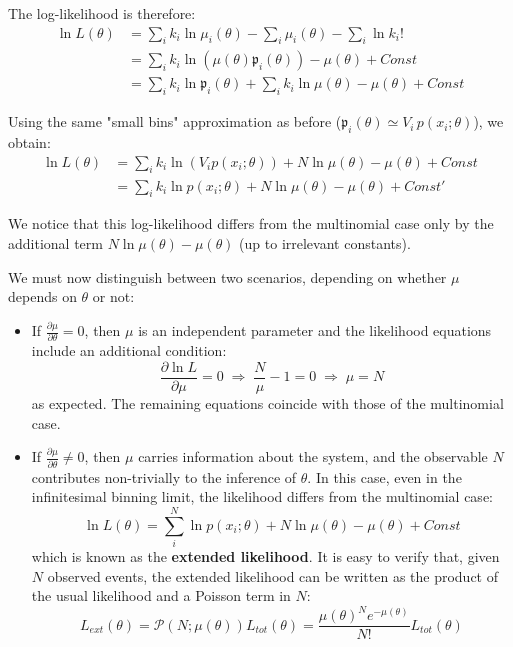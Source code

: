 The log-likelihood is therefore:
\begin{align*}
	\ln L(\theta)&=\sum_i k_i \ln \mu_i(\theta)-\sum_i \mu_i(\theta)-\sum_i \ln k_i!\\
	&=\sum_ik_i\ln (\mu (\theta) \mathfrak{p}_i(\theta))-\mu(\theta) + Const\\
	&=\sum_i k_i \ln \mathfrak{p}_i(\theta) + \sum_i k_i \ln \mu (\theta) -\mu(\theta) + Const
\end{align*}

Using the same "small bins" approximation as before ($\mathfrak{p}_i(\theta)\simeq V_i\,p(x_i;\theta)$), we obtain:
\begin{align*}
	\ln L(\theta)&=\sum_i k_i \ln (V_i p(x_i;\theta)) + N \ln \mu(\theta) - \mu(\theta) + Const \\
	&=\sum_i k_i \ln p(x_i;\theta)+ N \ln \mu(\theta) - \mu(\theta) + Const'
\end{align*}

We notice that this log-likelihood differs from the multinomial case only by the additional term $N \ln \mu(\theta) - \mu(\theta)$ (up to irrelevant constants).

We must now distinguish between two scenarios, depending on whether $\mu$ depends on $\theta$ or not:

\begin{itemize}
    \item If $\frac{\partial \mu}{\partial \theta} = 0$, then $\mu$ is an independent parameter and the likelihood equations include an additional condition:
    \[
		\frac{\partial \ln L}{\partial \mu} = 0 
		\;\Rightarrow\; \frac{N}{\mu} - 1 = 0 
		\;\Rightarrow\; \hat{\mu} = N
	\]
	as expected. The remaining equations coincide with those of the multinomial case.

    \item If $\frac{\partial \mu}{\partial \theta} \neq 0$, then $\mu$ carries information about the system, and the observable $N$ contributes non-trivially to the inference of $\theta$. In this case, even in the infinitesimal binning limit, the likelihood differs from the multinomial case:
	\begin{equation}
		\ln L(\theta)=\sum_i^{N}\ln p(x_i; \theta) + N \ln \mu(\theta) - \mu(\theta) + Const
		\label{eq:extended_likelihood}
	\end{equation}
	which is known as the \textbf{extended likelihood}. It is easy to verify that, given $N$ observed events, the extended likelihood can be written as the product of the usual likelihood and a Poisson term in $N$:
	\[
		L_{ext}(\theta)=\mathcal{P}(N;\mu(\theta))L_{tot}(\theta)=\frac{\mu(\theta)^Ne^{-\mu(\theta)}}{N!}L_{tot}(\theta)
	\]
\end{itemize}

